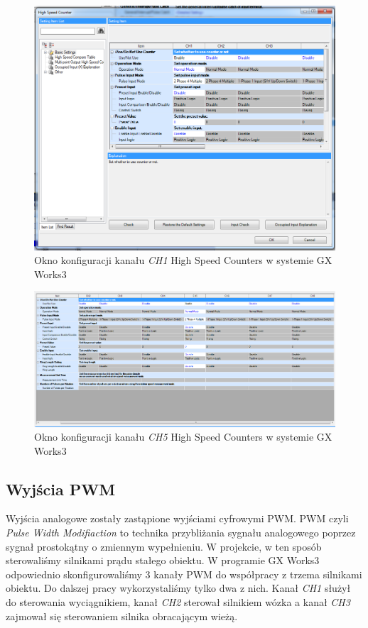 \documentclass{mwrep}
\begin{document}
\begin{figure}[H]
    \label{PLC::Konfiguracja::HIOEN::WindowCH1}
    \centering
    \includegraphics[scale=0.3]{hioen.png}
    \caption{Okno konfiguracji kanału \emph{CH1} High Speed Counters w systemie GX Works3}
\end{figure}

\begin{figure}[H]
    \label{PLC::Konfiguracja::HIOEN::WindowCH5}
    \leftskip-1.5cm
    \includegraphics[scale=0.3]{hioen2.png}
    \caption{Okno konfiguracji kanału \emph{CH5} High Speed Counters w systemie GX Works3}
\end{figure}


\subsection{Wyjścia PWM}
\label{PLC::Konfiguracja::PWM}
Wyjścia analogowe zostały zastąpione wyjściami cyfrowymi PWM. PWM czyli \emph{Pulse Width Modifiaction} to 
technika przybliżania sygnału analogowego poprzez sygnał prostokątny o zmiennym wypełnieniu. W projekcie,
w ten sposób sterowaliśmy silnikami prądu stałego obiektu. W programie GX Works3 odpowiednio
skonfigurowaliśmy 3 kanały PWM do współpracy z trzema silnikami obiektu. Do dalszej pracy 
wykorzystaliśmy tylko dwa z nich. Kanał \emph{CH1} służył do sterowania wyciągnikiem, kanał \emph{CH2}
sterował silnikiem wózka a kanał \emph{CH3} zajmował się sterowaniem silnika obracającym wieżą.
\end{document}
